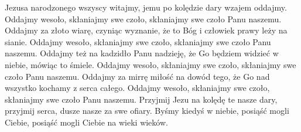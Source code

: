 \beginverse
Jezusa narodzonego wszyscy witajmy,
jemu po kolędzie dary wzajem oddajmy.
Oddajmy wesoło, skłaniajmy swe czoło,
skłaniajmy swe czoło Panu naszemu.
\endverse
\beginverse
Oddajmy za złoto wiarę, czyniąc wyznanie,
że to Bóg i człowiek prawy leży na sianie.
Oddajmy wesoło, skłaniajmy swe czoło,
skłaniajmy swe czoło Panu naszemu.
\endverse
\beginverse
Oddajmy też na kadzidło Panu nadzieję,
że Go będziem widzieć w niebie, mówiąc to śmiele.
Oddajmy wesoło, skłaniajmy swe czoło,
skłaniajmy swe czoło Panu naszemu.
\endverse
\beginverse
Oddajmy za mirrę miłość na dowód tego,
że Go nad wszystko kochamy z serca całego.
Oddajmy wesoło, skłaniajmy swe czoło,
skłaniajmy swe czoło Panu naszemu.
\endverse
\beginverse
Przyjmij Jezu na kolędę te nasze dary,
przyjmij serca, dusze nasze za swe ofiary.
Byśmy kiedyś w niebie, posiąść mogli Ciebie,
posiąść mogli Ciebie na wieki wieków.
\endverse
\endsong